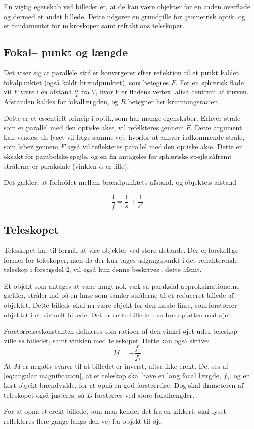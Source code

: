 En vigtig egenskab ved billeder er, at de kan være objekter for en anden overflade og dermed et andet billede. Dette udgører en grundpille for geometrisk optik, og er fundamentet for mikroskoper samt refraktions teleskoper. 


\subsection{Fokal-- punkt og længde}
Det viser sig at parallele stråler konvergerer efter reflektion til et punkt
kaldet fokalpunktet (også kaldt brændpunktet), som betegnes $F$. For en sphærisk flade vil $F$ være i en afstand $\frac{R}{2}$ fra $V$, hvor $V$ er fladens vertex, altså centrum af kurven. Afstanden kaldes for fokallængden, og $R$ betegner her krumningsradien.

Dette er et  essentielt princip i optik, som har mange egenskaber.
Enhver stråle som er parallel med den optiske akse, vil refelkteres gennem $F$. Dette argument kan vendes, da lyset vil følge samme vej, hvorfor at enhver indkommende stråle, som løber gennem $F$ også vil reflekteres parallel med den optiske akse. Dette er eksakt for parabolske spejle, og en fin antagelse for sphæriske spejle såfremt strålerne er paraksiale (vinklen $\alpha$ er lille).

Det gælder, at forholdet mellem brændpunktets afstand, og objektets afstand

\begin{equation}
    \frac{1}{f} = \frac{1}{s} + \frac{1}{s'}
    \label{eq:fokalvokal}
\end{equation}

\subsection{Teleskopet}
Teleskopet har til formål at vise objekter ved store afstande. Der er forskellige former for teleskoper, men da der kun tages udgangspunkt i det refrakterende teleskop i forsøgsdel $2$, vil også kun denne beskrives i dette afsnit.

Et objekt som antages at være langt nok væk så paraksial approksimationerne gælder, stråler ind på en linse som samler strålerne til et reduceret billede af objektet. Dette billede skal nu være objekt for den næste linse, som forstørrer objektet i et virtuelt billede. Det er dette billede som bør opfattes med øjet.

Forstørrelseskonstanten defineres som ratioen af den vinkel øjet uden teleskop ville se billedet, samt vinklen med teleskopet. Dette kan også skrives
\begin{equation}
    M = - \frac{f_1}{f_2}
    \label{eq:angular magnification}
\end{equation}
At $M$ er negativ svarer til at billedet er inverst, altså ikke erekt. Det ses af \cref{eq:angular magnification}, at et teleskop skal have en lang focal længde, $f_1$, og en kort objekt brændvidde, for at opnå en god forstørrelse. Dog skal diameteren af teleskopet også justeres, så $D$ forstørres ved store fokallængder.

For at opnå et erekt billede, som man kender det fra en kikkert, skal lyset reflekteres flere gange langs den vej fra objekt til øje.



